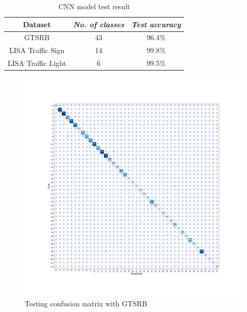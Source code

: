 \documentclass[conference]{IEEEtran}
\begin{document}
\begin{table}[H]
\caption{CNN model test result}
\begin{center}
\begin{tabular}{|c|c|c|}
\hline
\textbf{Dataset} & \textbf{\textit{No. of classes}}& \textbf{\textit{Test accuracy}} \\
\hline
GTSRB & 43 & 96.4\% \\
\hline
LISA Traffic Sign & 14 & 99.8\% \\
\hline
LISA Traffic Light& 6 & 99.5\% \\
\hline
\end{tabular}
\label{tab3}
\end{center}
\end{table}

\begin{figure}[H]
\centering
  \begin{minipage}{.3\textwidth}
    \centering
    \includegraphics[width=1.0\linewidth]{confusion_matrix_f.png}
    \caption{Testing confusion matrix with GTSRB}
    \label{fig:fig_1}
  \end{minipage}
\end{figure}
\end{document}
